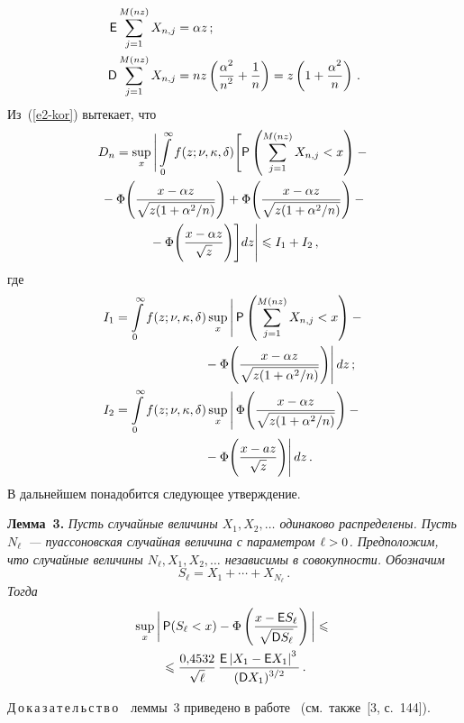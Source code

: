 \begin{multicols}{2}
\noindent
\begin{align*}
{\sf E}\sum\limits_{j=1}^{M(nz)}X_{n,j}&=\alpha z\,;
\\
{\sf D}\sum\limits_{j=1}^{M(nz)}X_{n,j}&=
nz\left(\displaystyle\frac{\displaystyle \alpha^2\mathstrut}{\displaystyle n^2\mathstrut}+\displaystyle\frac{\displaystyle 1\mathstrut}{\displaystyle n\mathstrut}\right)=z\left(1+\displaystyle\frac{\displaystyle \alpha^2\mathstrut}{\displaystyle n\mathstrut}\right)\,.
\end{align*}
Из~(\ref{e2-kor}) вытекает, что
\begin{multline}
D_n=\sup\limits_x\Bigg|\int\limits_{0}^{\infty}f(z;\nu,\kappa,\delta)\Bigg[{\sf
P}\left(\sum\limits_{j=1}^{M(nz)}X_{n,j}<x\right)-{}\\
{}-
\Phi\Bigg(\displaystyle\frac{\displaystyle x-\alpha
z\mathstrut}{\displaystyle \sqrt{z(1+{\alpha^2}/{n})}\mathstrut}\Bigg)+
\Phi\Bigg(\displaystyle\frac{\displaystyle x-\alpha z\mathstrut}{\displaystyle \sqrt{z(1+{\alpha^2}/{n})}\mathstrut}\Bigg)-{}\\
{}-
\Phi\Bigg(\displaystyle\frac{\displaystyle x-\alpha z\mathstrut}{\displaystyle \sqrt{z}\mathstrut}\Bigg)\Bigg]dz\Bigg| \leqslant I_1+I_2\,,
\label{e14-kor}
\end{multline}
где
\begin{align*}
I_1&=\int\limits_{0}^{\infty}f(z;\nu,\kappa,\delta)\sup_x\Bigg|\,{\sf P}
\left(\sum\limits_{j=1}^{M(nz)}X_{n,j}<x\right)-{}\\
&\hspace*{25mm}{}-
\Phi\Bigg(\fr{x-\alpha z}{\sqrt{z(1+{\alpha^2}/{n})}}\Bigg)\Bigg|\,dz\,;
\\
I_2&=\int\limits_{0}^{\infty}f(z;\nu,\kappa,\delta)
\sup\limits_x\Bigg|\,\Phi\Bigg(\fr{x-\alpha z}{\sqrt{z(1+{\alpha^2}/{n})}}\Bigg)-{}\\
&\hspace*{25mm}{}-
\Phi\Bigg(\fr{x-az}{\sqrt{z}}\Bigg)\Bigg|\,dz\,.
\end{align*}
В дальнейшем понадобится следующее утверждение.

\smallskip

\noindent
\textbf{Лемма~3.} \textit{Пусть случайные величины $X_1,X_2,\ldots$
одинаково распределены. Пусть $N_{\ell}$~--- пуассоновская случайная
величина с параметром $\ell\hm>0$. Предположим, что случайные величины
$N_{\ell},X_1,X_2,\ldots$ независимы в совокупности. Обозначим
$$
S_{\ell}=X_1+\cdots+X_{N_{\ell}}\,.
$$
Тогда}
\begin{multline*}
\sup\limits_x\bigg|\,{\sf P}(S_{\ell}<x)-\Phi\left(\displaystyle\frac{\displaystyle x-{\sf
E}S_{\ell}\mathstrut}{\displaystyle \sqrt{{\sf
D}S_{\ell}}\mathstrut}\right)\bigg|\leqslant{}\\
{}\leqslant\displaystyle\frac{\displaystyle 0{,}4532\mathstrut}{\displaystyle \sqrt{\ell}\mathstrut}\,\displaystyle\frac{\displaystyle {\sf E}
\left\vert X_1-{\sf E}X_1\right\vert^3\mathstrut}{\displaystyle ({\sf D}X_1)^{3/2}\mathstrut}\,.
\end{multline*}

\noindent
Д\,о\,к\,а\,з\,а\,т\,е\,л\,ь\,с\,т\,в\,о\ \  леммы~3 приведено в 
работе~\cite{KorolevShevtsovaShorgin2011} (см.\ так\-же~[3,  с.~144]).


\end{multicols}
